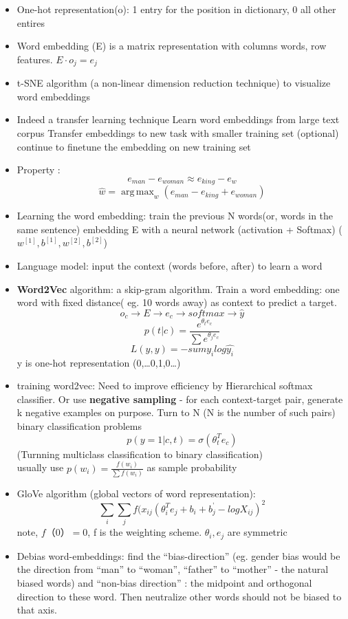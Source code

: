 \documentclass[11pt, openany]{book}              %
\DeclareMathOperator*{\argmax}{arg\,max}  %
\begin{document}
\begin{itemize}
    \item One-hot representation(o): 1 entry for the position in dictionary, 0 all other entires
    \item Word embedding (E) is a matrix representation with columns words, row features.  $E \cdot o_j = e_j$
    \item t-SNE algorithm (a non-linear dimension reduction technique) to visualize word embeddings
    \item Indeed a transfer learning technique
    	\subitem Learn word embeddings from large text corpus
    	\subitem Transfer embeddings to new task with smaller training set 
    	\subitem (optional) continue to finetune the embedding on new training set
	\item Property : 
		$$e_{man} - e_{woman}  \approx e_{king} - e_{w}$$
		$$\hat{w} = \argmax_{w} (e_{man}  - e_{king} +e_{woman}) $$
	\item Learning the word embedding: train the previous N words(or, words in the same sentence) embedding E with a neural network (activation + Softmax) ( $w^{[1]}, b^{[1]}, w^{[2]}, b^{[2]}$) 
	\item Language model: input the context (words before, after) to learn a word 
	\item \textbf{Word2Vec} algorithm: a skip-gram algorithm. Train a word embedding: one word with fixed distance( eg. 10 words away) as context to predict a target. 
		$$ o_c \rightarrow E \rightarrow e_c \rightarrow softmax \rightarrow \hat{y}$$
		$$p(t|c) = \frac{e^{\theta_t e_c}}{\sum e^{\theta_j e_c}}$$
		$$L(\hat{y},y )= - sum y_i log \hat{y_i}$$
		y is one-hot representation (0,…0,1,0…)
	\item training word2vec: Need to improve efficiency by Hierarchical softmax classifier. Or use \textbf{negative sampling} - for each context-target pair, generate k negative examples on purpose. Turn to N (N is the number of such pairs) binary classification problems 
		$$p(y = 1 | c, t ) = \sigma( \theta_t^T e_c)$$
		(Turnning multiclass classification to binary classification)\\ 
		usually use $p(w_i) = \frac{f(w_i)}{\sum f (w_i)}$ as sample probability 
	\item GloVe algorithm (global vectors of word representation):
		$$\sum_i \sum_j f(x_{ij} (\theta_i ^ T e_j + b_i + b_j^’ - log X_{ij})^2$$ note, $f（0）= 0$, f is the weighting scheme. $\theta_i, e_j$ are symmetric
	\item Debias word-embeddings: find the “bias-direction” (eg. gender bias would be the direction from “man” to “woman”, “father” to “mother” - the natural biased words) and “non-bias direction” : the midpoint and orthogonal direction to these word. Then neutralize other words should not be biased to that axis. 
\end{itemize}
\end{document}
